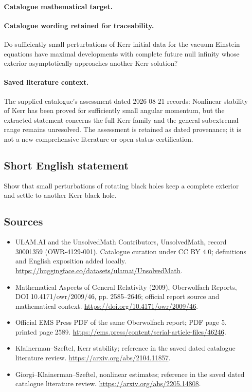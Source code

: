 \documentclass[11pt]{article}
\begin{document}
\paragraph{Catalogue mathematical target.}
\paragraph{Catalogue wording retained for traceability.}
Do sufficiently small perturbations of Kerr initial data for the vacuum Einstein equations have maximal developments with complete future null infinity whose exterior asymptotically approaches another Kerr solution?

\paragraph{Saved literature context.} The supplied catalogue's assessment dated 2026-08-21 records: Nonlinear stability of Kerr has been proved for sufficiently small angular momentum, but the extracted statement concerns the full Kerr family and the general subextremal range remains unresolved. The assessment is retained as dated provenance; it is not a new comprehensive literature or open-status certification.
\subsection{Short English statement}
Show that small perturbations of rotating black holes keep a complete exterior and settle to another Kerr black hole.
\subsection{Sources}
\begin{itemize}
\item[\hypertarget{source:30001359:1}{S1}] ULAM.AI and the UnsolvedMath Contributors, UnsolvedMath, record 30001359 (OWR-4129-001). Catalogue curation under CC BY 4.0; definitions and English exposition added locally.
\url{https://huggingface.co/datasets/ulamai/UnsolvedMath}.
\item[\hypertarget{source:30001359:2}{S2}] Mathematical Aspects of General Relativity (2009), Oberwolfach Reports, DOI 10.4171/owr/2009/46, pp. 2585--2646; official report source and mathematical context.
\url{https://doi.org/10.4171/owr/2009/46}.
\item[\hypertarget{source:30001359:3}{S3}] Official EMS Press PDF of the same Oberwolfach report; PDF page 5, printed page 2589.
\url{https://ems.press/content/serial-article-files/46246}.
\item[\hypertarget{source:30001359:4}{S4}] Klainerman--Szeftel, Kerr stability; reference in the saved dated catalogue literature review.
\url{https://arxiv.org/abs/2104.11857}.
\item[\hypertarget{source:30001359:5}{S5}] Giorgi--Klainerman--Szeftel, nonlinear estimates; reference in the saved dated catalogue literature review.
\url{https://arxiv.org/abs/2205.14808}.
\end{itemize}
\label{end:30001359}
\end{document}
